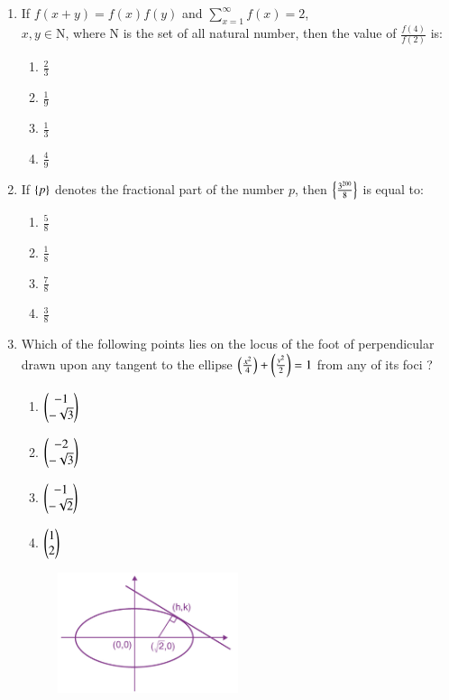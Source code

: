 \documentclass[journal]{IEEEtran}
\theoremstyle{remark}
\begin{document}
\begin{enumerate}
\item  If $f(x + y) = f(x) f(y)$ and $\sum_{x=1}^{\infty} f(x) = 2$,\\
$x, y \in $N, where N is the set of all natural number, then the value of $\frac{f(4)}{f(2)}$ is:


\begin{multicols}{4}
\begin{enumerate}
\item $\frac{2}{3}$
\item $\frac{1}{9}$
\item $\frac{1}{3}$
\item $\frac{4}{9}$
\end{enumerate}
\end{multicols}

\item  If $\left\{p\right\}$ denotes the fractional part of the number $p$, then $\left\{\frac{3^{200}}{8}\right\}$ is equal to:

\begin{multicols}{4}
\begin{enumerate}
\item $\frac{5}{8}$
\item $\frac{1}{8}$
\item $\frac{7}{8}$
\item $\frac{3}{8}$
\end{enumerate}
\end{multicols}

\item  Which of the following points lies on the locus of the foot of perpendicular drawn upon any tangent to the ellipse $\left(\frac{x^2}{4}\right)+\left(\frac{y^2}{2}\right) = 1$ from any of its foci ?



\begin{multicols}{4}
\begin{enumerate}
\item $\begin{pmatrix}-1 \\ -\sqrt{3}\end{pmatrix}$
\item $\begin{pmatrix}-2 \\ -\sqrt{3}\end{pmatrix}$
\item $\begin{pmatrix}-1 \\ -\sqrt{2}\end{pmatrix}$
\item $\begin{pmatrix}1 \\ 2\end{pmatrix}$
\end{enumerate}
\end{multicols}

\begin{figure}[h] 
    \centering
    \includegraphics[width=0.5\textwidth]{figure/15.png}
\end{figure}

\end{enumerate}
\end{document}
